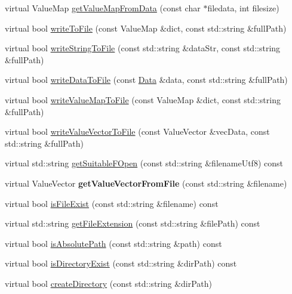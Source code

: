 \begin{DoxyCompactItemize}
\item 
virtual Value\+Map \hyperlink{classFileUtils_a3b1cb7c770ba78d1d68c2da204e15a15}{get\+Value\+Map\+From\+Data} (const char $\ast$filedata, int filesize)
\item 
virtual bool \hyperlink{classFileUtils_a503e4cf24b5bd8b13780370fa8e2c8f4}{write\+To\+File} (const Value\+Map \&dict, const std\+::string \&full\+Path)
\item 
virtual bool \hyperlink{classFileUtils_acd55f56b9ae5d635f4194132b4aeee14}{write\+String\+To\+File} (const std\+::string \&data\+Str, const std\+::string \&full\+Path)
\item 
virtual bool \hyperlink{classFileUtils_a448ef43bd4c31852611018c951dd6eda}{write\+Data\+To\+File} (const \hyperlink{classData}{Data} \&data, const std\+::string \&full\+Path)
\item 
virtual bool \hyperlink{classFileUtils_a3bfc1cbc320b69f8fd2581431f6362d1}{write\+Value\+Map\+To\+File} (const Value\+Map \&dict, const std\+::string \&full\+Path)
\item 
virtual bool \hyperlink{classFileUtils_a68821bd490a13b47e0e397980eabe481}{write\+Value\+Vector\+To\+File} (const Value\+Vector \&vec\+Data, const std\+::string \&full\+Path)
\item 
virtual std\+::string \hyperlink{classFileUtils_a318996e1e3cc1ff7463dea9159d7e7be}{get\+Suitable\+F\+Open} (const std\+::string \&filename\+Utf8) const
\item 
\mbox{\label{classFileUtils_a7141ac7fe02980d1e3f78614e73aa0fa}} 
virtual Value\+Vector {\bfseries get\+Value\+Vector\+From\+File} (const std\+::string \&filename)
\item 
virtual bool \hyperlink{classFileUtils_a4e849a9b77e09971c4d8b879a5243eb3}{is\+File\+Exist} (const std\+::string \&filename) const
\item 
virtual std\+::string \hyperlink{classFileUtils_a98ad20968d4fbab847ec823d49dda262}{get\+File\+Extension} (const std\+::string \&file\+Path) const
\item 
virtual bool \hyperlink{classFileUtils_aed08c5ac2854f3fb5c104386ab96a90c}{is\+Absolute\+Path} (const std\+::string \&path) const
\item 
virtual bool \hyperlink{classFileUtils_a900bb088db70c091dd5c1984735925c1}{is\+Directory\+Exist} (const std\+::string \&dir\+Path) const
\item 
virtual bool \hyperlink{classFileUtils_a04129d55c22dfa031fd45aeda4de5e77}{create\+Directory} (const std\+::string \&dir\+Path)

\end{DoxyCompactItemize}
